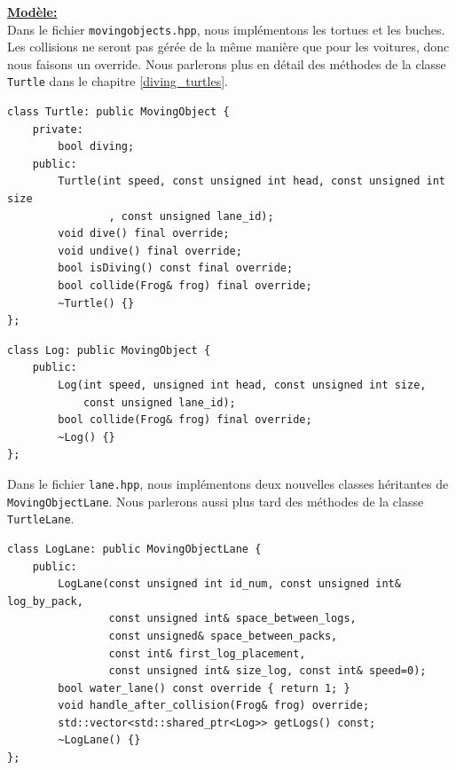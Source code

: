 \documentclass[a4paper, 12pt]{article}
\begin{document}
\underline{\textbf{Modèle:}} \\
Dans le fichier \texttt{movingobjects.hpp}, nous implémentons les tortues et les buches. Les collisions ne seront pas gérée de la même manière que pour les voitures, donc nous faisons un override. Nous parlerons plus en détail des méthodes de la classe \texttt{Turtle} dans le chapitre \ref{diving_turtles}. \\

\begin{lstlisting}
class Turtle: public MovingObject {
    private:
        bool diving;
    public:
        Turtle(int speed, const unsigned int head, const unsigned int size
                , const unsigned lane_id);
        void dive() final override;
        void undive() final override;
        bool isDiving() const final override;
        bool collide(Frog& frog) final override;
        ~Turtle() {}
};
\end{lstlisting}

\begin{lstlisting}
class Log: public MovingObject {
    public:
        Log(int speed, unsigned int head, const unsigned int size,
            const unsigned lane_id);
        bool collide(Frog& frog) final override;
        ~Log() {}
};
\end{lstlisting} \hspace{0.5cm}

Dans le fichier \texttt{lane.hpp}, nous implémentons deux nouvelles classes héritantes de \texttt{MovingObjectLane}. 
Nous parlerons aussi plus tard des méthodes de la classe \texttt{TurtleLane}. \\

\begin{lstlisting}
class LogLane: public MovingObjectLane {
    public:
        LogLane(const unsigned int id_num, const unsigned int& log_by_pack,
                const unsigned int& space_between_logs,
                const unsigned& space_between_packs,
                const int& first_log_placement,
                const unsigned int& size_log, const int& speed=0);
        bool water_lane() const override { return 1; }
        void handle_after_collision(Frog& frog) override;
        std::vector<std::shared_ptr<Log>> getLogs() const;
        ~LogLane() {}
};
\end{lstlisting}
\end{document}
